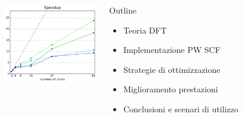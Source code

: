 \documentclass[8pt]{beamer}
\begin{document}
\begin{frame}{}
\begin{columns}
		\begin{center}
			\includegraphics[height=3.5cm]{beam_first_slide.pdf}
		\end{center}
	\begin{block}{Outline}
		\begin{itemize}
			\item Teoria DFT
			\pause
			\item Implementazione PW SCF
			\pause
			\item Strategie di ottimizzazione
			\pause
			\item Miglioramento prestazioni
			\pause
			\item Conclusioni e scenari di utilizzo
		\end{itemize}
	\end{block}
\end{columns}
		
\end{frame}
\end{document}
